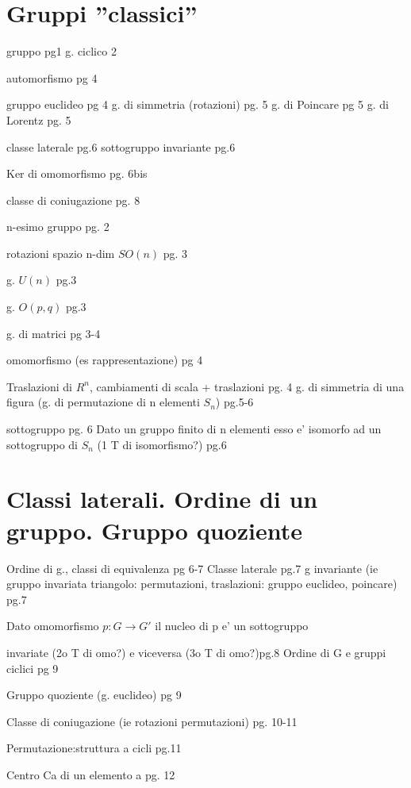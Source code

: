 \documentclass[oneside,12pt]{memoir}
\begin{document}
\section{Gruppi ''classici''}

\begin{itemize*}
\item gruppo pg1
g. ciclico 2
\item automorfismo pg 4
\item gruppo euclideo pg 4
g.  di simmetria (rotazioni) pg. 5
g. di Poincare pg 5
g. di Lorentz pg. 5
\item classe laterale pg.6
sottogruppo invariante pg.6
\item Ker di omomorfismo pg. 6bis
\item classe di coniugazione pg. 8
\item n-esimo gruppo pg. 2
\item rotazioni spazio n-dim $SO(n)$ pg. 3
\item g. $U(n)$ pg.3
\item g. $O(p,q)$ pg.3
\item g. di matrici pg 3-4
\item omomorfismo (es rappresentazione) pg 4
\item Traslazioni di $R^n$, cambiamenti di scala + traslazioni pg. 4
g. di simmetria di una figura (g. di permutazione di n elementi $S_n$) pg.5-6
\item sottogruppo pg. 6
Dato un gruppo finito di n elementi esso e' isomorfo ad un sottogruppo di $S_n$ (1 T di isomorfismo?) pg.6

\end{itemize*}

\section{Classi laterali. Ordine di un gruppo. Gruppo quoziente}

\begin{itemize*}
\item Ordine di g., classi di equivalenza pg 6-7
Classe laterale pg.7
g invariante (ie gruppo invariata triangolo: permutazioni, traslazioni: gruppo euclideo, poincare) pg.7
\item Dato omomorfismo $p:G\to G'$ il nucleo di p e' un sottogruppo \item invariate (2o T di omo?) e viceversa (3o T di omo?)pg.8
Ordine di G e gruppi ciclici pg 9
\item Gruppo quoziente (g. euclideo) pg 9
\item Classe di coniugazione (ie rotazioni permutazioni) pg. 10-11
\item Permutazione:struttura a cicli pg.11
\item Centro Ca di un elemento a pg. 12
\end{itemize*}
\end{document}
